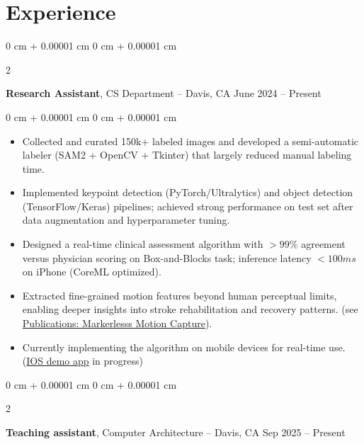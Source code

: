 \documentclass[10pt, letterpaper]{article}
\newenvironment{highlights}{
    \begin{itemize}[
        topsep=0.10 cm,
        parsep=0.10 cm,
        partopsep=0pt,
        itemsep=0pt,
        leftmargin=0 cm + 10pt
    ]
}{
    \end{itemize}
} %
\newenvironment{onecolentry}{
    \begin{adjustwidth}{
        0 cm + 0.00001 cm
    }{
        0 cm + 0.00001 cm
    }
}{
    \end{adjustwidth}
} %
\newenvironment{twocolentry}[2][]{
    \onecolentry
    \def\secondColumn{#2}
    \setcolumnwidth{\fill, 6 cm}
    \begin{paracol}{2}
}{
    \switchcolumn \raggedleft \secondColumn
    \end{paracol}
    \endonecolentry
} %
\begin{document}
    
    \section{Experience}



        
        \begin{twocolentry}{
            June 2024 – Present
        }
            \textbf{Research Assistant}, CS Department -- Davis, CA\end{twocolentry}

        \vspace{0.10 cm}
        \begin{onecolentry}
            \begin{highlights}
                \item Collected and curated 150k+ labeled images and developed a semi-automatic labeler (SAM2 + OpenCV + Tkinter) that largely reduced manual labeling time.
                \item Implemented keypoint detection (PyTorch/Ultralytics) and object detection (TensorFlow/Keras) pipelines; achieved strong performance on test set after data augmentation and hyperparameter tuning.
                \item Designed a real-time clinical assessment algorithm with $>99\%$ agreement versus physician scoring on Box-and-Blocks task; inference latency $<100ms$ on iPhone (CoreML optimized).
                \item Extracted fine-grained motion features beyond human perceptual limits, enabling deeper insights into stroke rehabilitation and recovery patterns. (see \hyperref[pub:markerless-motion-capture]{Publications: Markerlesss Motion Capture}). 
                \item Currently implementing the algorithm on mobile devices for real-time use.  (\href{https://github.com/AlundorZhu/CMORE-app}{IOS demo app} in progress)
            \end{highlights}
        \end{onecolentry}

        \vspace{0.2 cm}

        \begin{twocolentry}{
            Sep 2025 – Present
        }
            \textbf{Teaching assistant}, Computer Architecture -- Davis, CA\end{twocolentry}
\end{document}
